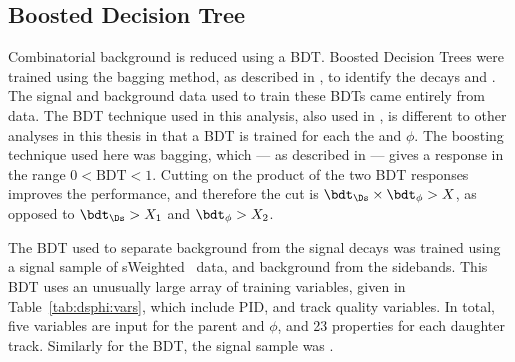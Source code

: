 


\subsection{Boosted Decision Tree}
Combinatorial background is reduced using a BDT.
Boosted Decision Trees were trained using the bagging method, as described in , to
identify the decays \decay{\Ds}{\kkpi} and \decay{\phi}{\kk}.
The signal and background data used to train these BDTs came entirely from data.
The BDT technique used in this analysis, also used in , is different to
other analyses in this thesis in that a BDT is trained for each the \Ds and $\phi$.
The boosting technique used here was bagging, which --- as described in  --- gives
a response in the range $0<\mathrm{BDT}<1$.
Cutting on the product of the two BDT responses improves the performance, and therefore the cut is
$\bdt_{\Ds}\times\bdt_\phi>X$, as opposed to $\bdt_{\Ds}>X_1$ and $\bdt_\phi>X_2$.

The BDT used to separate background from the signal \decay{\Ds}{\kkpi} decays was trained using
a signal sample of \decay{\Bs}{\Dsm\pip} sWeighted~\cite{splot} data, and background from the \Dsm
sidebands.
This BDT uses an unusually large array of training variables, given in Table~\ref{tab:dsphi:vars},
which include PID, and track quality variables.
In total, five variables are input for the parent \Ds and $\phi$, and 23 properties for each
daughter track.
Similarly for the \decay{\phi}{\kk} BDT, the signal sample was \decay{\Bs}{\jpsi\phi}.


